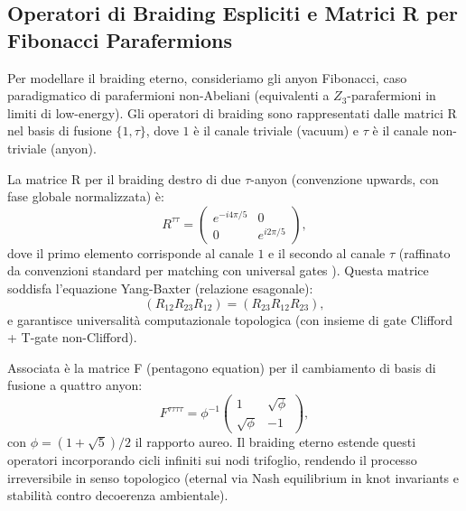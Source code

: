 \documentclass[11pt,a4paper]{article}
\let\oldcite\cite
\renewcommand{\cite}{\protect\oldcite}
\theoremstyle{plain}
\theoremstyle{definition}
\begin{document}
\vspace{0.4cm}

\subsection{Operatori di Braiding Espliciti e Matrici R per Fibonacci Parafermions}

Per modellare il braiding eterno, consideriamo gli anyon Fibonacci, caso paradigmatico di parafermioni non-Abeliani (equivalenti a $Z_3$-parafermioni in limiti di low-energy). Gli operatori di braiding sono rappresentati dalle matrici R nel basis di fusione $\{1, \tau\}$, dove $1$ è il canale triviale (vacuum) e $\tau$ è il canale non-triviale (anyon).

La matrice R per il braiding destro di due $\tau$-anyon (convenzione upwards, con fase globale normalizzata) è:
\begin{equation}
R^{\tau\tau} = \begin{pmatrix}
e^{-i 4\pi / 5} & 0 \\
0 & e^{i 2\pi / 5}
\end{pmatrix},
\end{equation}
dove il primo elemento corrisponde al canale $1$ e il secondo al canale $\tau$ (raffinato da convenzioni standard per matching con universal gates \cite{Nayak2008}). Questa matrice soddisfa l'equazione Yang-Baxter (relazione esagonale):
\begin{equation}
(R_{12} R_{23} R_{12}) = (R_{23} R_{12} R_{23}),
\end{equation}
e garantisce universalità computazionale topologica (con insieme di gate Clifford + T-gate non-Clifford).

Associata è la matrice F (pentagono equation) per il cambiamento di basis di fusione a quattro anyon:
\begin{equation}
F^{\tau\tau\tau\tau} = \phi^{-1} \begin{pmatrix}
1 & \sqrt{\phi} \\
\sqrt{\phi} & -1
\end{pmatrix},
\end{equation}
con $\phi = (1 + \sqrt{5})/2$ il rapporto aureo. Il braiding eterno estende questi operatori incorporando cicli infiniti sui nodi trifoglio, rendendo il processo irreversibile in senso topologico (eternal via Nash equilibrium in knot invariants e stabilità contro decoerenza ambientale).


\vspace{0.4cm}
\end{document}
